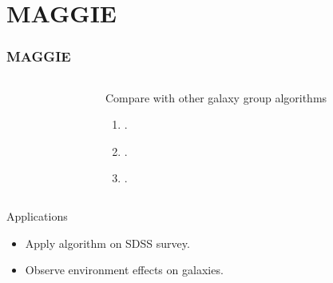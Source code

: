 \section{MAGGIE}
\begin{frame}
    \frametitle{MAGGIE}
    \begin{columns}
        \begin{column}{0.45\textwidth}
        \end{column}
        \begin{column}{0.55\textwidth}
            \begin{block}{Compare with other galaxy group algorithms}
                \begin{enumerate}
                    \item \citet{Yang+07}.
                    \item \citet{Berlind+06}.
                    \item \citet{DominguezRomero+12}.
                \end{enumerate}
            \end{block}
        \end{column}
    \end{columns}
    \begin{block}{Applications}
        \begin{itemize}
            \item Apply algorithm on SDSS survey.
            \item Observe environment effects on galaxies.
        \end{itemize}
    \end{block}
\end{frame}

